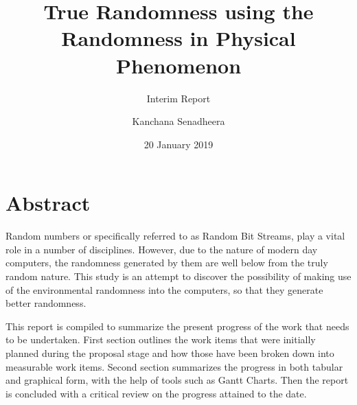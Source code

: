\documentclass{scrartcl}
\title{True Randomness using the Randomness in Physical Phenomenon}
\subtitle{Interim Report}
\author{Kanchana Senadheera}
\date{20 January 2019}
\begin{document}
\maketitle

\section*{Abstract}
Random numbers or specifically referred to as Random Bit Streams, play a vital role in a number of disciplines. However, due to the nature of modern day computers, the randomness generated by them are well below from the truly random nature. This study is an attempt to discover the possibility of making use of the environmental randomness into the computers, so that they generate better randomness.
\par This report is compiled to summarize the present progress of the work that needs to be undertaken. First section outlines the work items that were initially planned during the proposal stage and how those have been broken down into measurable work items. Second section summarizes the progress in both tabular and graphical form, with the help of tools such as Gantt Charts. Then the report is concluded with a critical review on the progress attained to the date.
\end{document}
